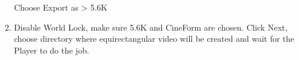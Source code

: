 \documentclass[a4paper,12pt]{book}
\begin{document}
\begin{enumerate}
\begin{minipage}[t]{\linewidth}
{	 	}		
	 	\medskip	
	 \end{minipage}
	 Choose Export as > 5.6K
	 \item \begin{minipage}[t]{\linewidth}
	 	\raggedright
	 	\medskip	
	 \end{minipage}
	 Disable World Lock, make sure 5.6K and CineForm are chosen. Click Next, choose directory where equirectangular video will be created and wait for the Player to do the job.
\end{enumerate}
\end{document}

